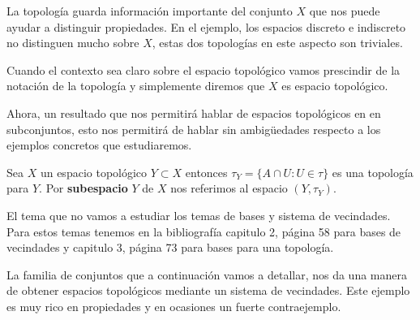 La topología guarda información importante del conjunto $X$ que nos puede ayudar a distinguir propiedades. En el ejemplo, los espacios discreto e indiscreto no distinguen mucho sobre $X$, estas dos topologías en este aspecto son triviales.

\begin{cn}
Cuando el contexto sea claro sobre el espacio topológico vamos prescindir de la notación de la topología y simplemente diremos que $X$ es espacio topológico. 
\end{cn}

Ahora, un resultado que nos permitirá hablar de espacios topológicos en en subconjuntos, esto nos permitirá de hablar sin ambigüedades respecto a los ejemplos concretos que estudiaremos. 

\begin{te}
Sea $X$ un espacio topológico $Y \subset X$ entonces $\tau_Y =\{A \cap U: U \in \tau\}$ es una topología para $Y$. Por \textbf{subespacio} $Y$ de $X$ nos referimos al espacio $(Y, \tau_Y)$.
\end{te}

\begin{cn}
El tema que no vamos a estudiar los temas de bases y sistema de vecindades. Para estos temas tenemos en la bibliografía \cite{top_prieto} capitulo 2, página 58 para bases de vecindades y capitulo 3, página 73 para bases para una topología.
\end{cn}

La familia de conjuntos que a continuación vamos a detallar, nos da una manera de obtener espacios topológicos mediante un sistema de vecindades. Este ejemplo es muy rico en propiedades y en ocasiones un fuerte contraejemplo. 


